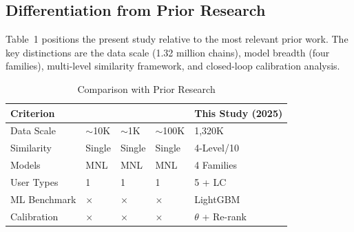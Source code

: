 \subsection{Differentiation from Prior Research}

Table~1 positions the present study relative to the most relevant prior work.
The key distinctions are the data scale (1.32 million chains), model breadth
(four families), multi-level similarity framework, and closed-loop calibration
analysis.

\begin{table}[htbp]
\centering
\tablefont
\begin{tabular}{|l|l|l|l|l|}
\hline
\headrow
\textbf{Criterion} & \textbf{\cite{kim2020}} & \textbf{\cite{yoo2015}} &
\textbf{\cite{arriagada2025}} & \textbf{This Study (2025)} \\
\hline
Data Scale    & $\sim$10K & $\sim$1K & $\sim$100K & 1,320K \\
\hline
Similarity    & Single & Single & Single & 4-Level/10 \\
\hline
Models        & MNL & MNL & MNL & 4 Families \\
\hline
User Types    & 1 & 1 & 1 & 5 + LC \\
\hline
ML Benchmark  & $\times$ & $\times$ & $\times$ & LightGBM \\
\hline
Calibration   & $\times$ & $\times$ & $\times$ & $\theta$ + Re-rank \\
\hline
\end{tabular}
\caption{Comparison with Prior Research}
\end{table}
